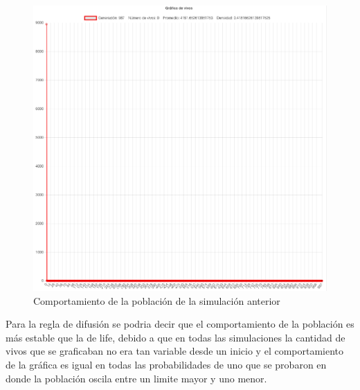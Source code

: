 	\begin{figure}[H]
		\begin{center}
			\includegraphics[scale=.24]{GOL/img/life90-2.png}
			\caption{Comportamiento de la población de la simulación anterior}
			\label{fig:gol5}
		\end{center}
	\end{figure}

Para la regla de difusión se podria decir que el comportamiento de la población es más estable que la de life, debido a que en todas las simulaciones la cantidad de vivos que se graficaban no era tan variable desde un inicio y el comportamiento de la gráfica es igual en todas las probabilidades de uno que se probaron en donde la población oscila entre un limite mayor y uno menor.
